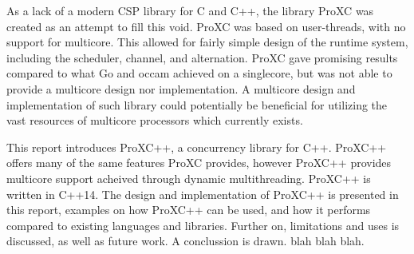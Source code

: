 As a lack of a modern CSP library for C and C++, the library ProXC was created as an attempt to fill this void. ProXC was based on user-threads, with no support for multicore. This allowed for fairly simple design of the runtime system, including the scheduler, channel, and alternation. ProXC gave promising results compared to what Go and occam achieved on a singlecore, but was not able to provide a multicore design nor implementation. A multicore design and implementation of such library could potentially be beneficial for utilizing the vast resources of multicore processors which currently exists. 


This report introduces ProXC++, a concurrency library for C++. ProXC++ offers many of the same features ProXC provides, however ProXC++ provides multicore support acheived through dynamic multithreading. ProXC++ is written in C++14. The design and implementation of ProXC++ is presented in this report, examples on how ProXC++ can be used, and how it performs compared to existing languages and libraries. Further on, limitations and uses is discussed, as well as future work. A conclussion is drawn.  blah blah blah.

